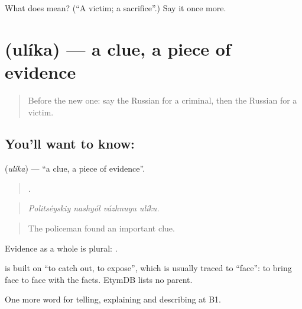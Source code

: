\begin{tcolorbox}[breakable,colback=teal!4,colframe=teal!35!black,title={Before you move on}]
What does  mean? (\textquotedblleft{}A victim; a sacrifice\textquotedblright{}.) Say it once more.
\end{tcolorbox}
\section[\texorpdfstring{\ru{улика} (ulíka)}{улика (ulíka)}]{ (ulíka) — a clue, a piece of evidence}

\label{lesson:RU-C287-ulika}



\begin{quote}
Before the new one: say the Russian for a criminal, then the Russian for a victim.
\end{quote}

\subsection*{You'll want to know: }
\textbf{} (\emph{ulíka}) — \textquotedblleft{}a clue, a piece of evidence\textquotedblright{}.

\begin{quote}
   .
\end{quote}

\begin{quote}
\emph{Politséyskiy nashyól vázhnuyu ulíku.}
\end{quote}

\begin{quote}
The policeman found an important clue.
\end{quote}

Evidence as a whole is plural: \emph{}.

\begin{cousinweb}
\emph{} is built on \emph{} \textquotedblleft{}to catch out, to expose\textquotedblright{}, which is usually traced to \emph{} \textquotedblleft{}face\textquotedblright{}: to bring face to face with the facts. EtymDB lists no parent.
\end{cousinweb}

\begin{grammarlens}[title={What you've built}]
One more word for telling, explaining and describing at B1.
\end{grammarlens}

